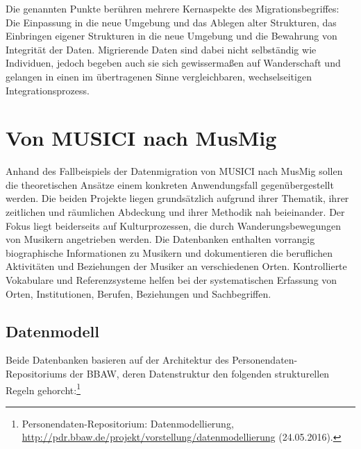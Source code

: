 \documentclass[a4paper,
fontsize=11pt,
oneside,
numbers=noperiodatend,
parskip=half-,
bibliography=totoc,
final
]{scrartcl}
\begin{document}
Die genannten Punkte berühren mehrere Kernaspekte des
Migrationsbegriffes: Die Einpassung in die neue Umgebung und das Ablegen
alter Strukturen, das Einbringen eigener Strukturen in die neue Umgebung
und die Bewahrung von Integrität der Daten. Migrierende Daten sind dabei
nicht selbständig wie Individuen, jedoch begeben auch sie sich
gewissermaßen auf Wanderschaft und gelangen in einen im übertragenen
Sinne vergleichbaren, wechselseitigen Integrationsprozess.

\section*{Von MUSICI nach MusMig}\label{von-musici-nach-musmig}

Anhand des Fallbeispiels der Datenmigration von MUSICI nach MusMig
sollen die theoretischen Ansätze einem konkreten Anwendungsfall
gegenübergestellt werden. Die beiden Projekte liegen grundsätzlich
aufgrund ihrer Thematik, ihrer zeitlichen und räumlichen Abdeckung und
ihrer Methodik nah beieinander. Der Fokus liegt beiderseits auf
Kulturprozessen, die durch Wanderungsbewegungen von Musikern angetrieben
werden. Die Datenbanken enthalten vorrangig biographische Informationen
zu Musikern und dokumentieren die beruflichen Aktivitäten und
Beziehungen der Musiker an verschiedenen Orten. Kontrollierte Vokabulare
und Referenzsysteme helfen bei der systematischen Erfassung von Orten,
Institutionen, Berufen, Beziehungen und Sachbegriffen.

\subsection*{Datenmodell}\label{datenmodell}

Beide Datenbanken basieren auf der Architektur des
Personendaten-Repositoriums der BBAW, deren Datenstruktur den folgenden
strukturellen Regeln gehorcht:\footnote{Personendaten-Repositorium:
  Datenmodellierung,
  \url{http://pdr.bbaw.de/projekt/vorstellung/datenmodellierung}
  (24.05.2016).}
\end{document}
